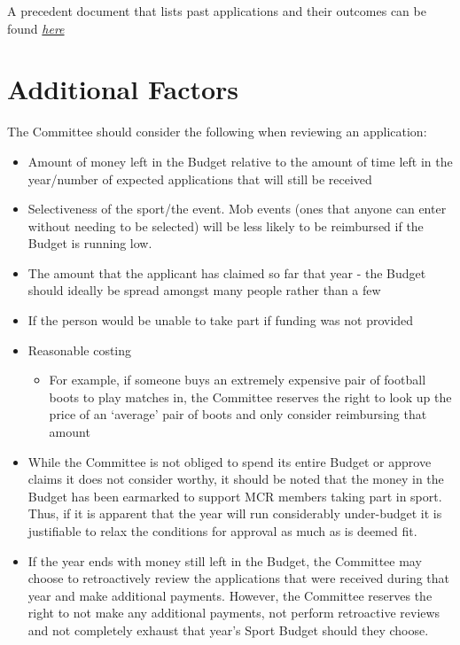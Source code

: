A precedent document that lists past applications and their outcomes can be found \href{https://docs.google.com/document/d/1C7BfB_jgS3wMEleUC6G4ZU182yfILvuTf4rHGR9wSyk/edit}{\textit{here}}

\section{Additional Factors}
The Committee should consider the following when reviewing an application:
\begin{itemize}
	\item Amount of money left in the Budget relative to the amount of time left in the year/number of expected applications that will still be received
	\item Selectiveness of the sport/the event. Mob events (ones that anyone can enter without needing to be selected) will be less likely to be reimbursed if the Budget is running low.
	\item The amount that the applicant has claimed so far that year - the Budget should ideally be spread amongst many people rather than a few
	\item If the person would be unable to take part if funding was not provided
	\item Reasonable costing
	\begin{itemize}
		\item For example, if someone buys an extremely expensive pair of football boots to play matches in, the Committee reserves the right to look up the price of an `average' pair of boots and only consider reimbursing that amount
	\end{itemize}
	\item While the Committee is not obliged to spend its entire Budget or approve claims it does not consider worthy, it should be noted that the money in the Budget has been earmarked to support MCR members taking part in sport. Thus, if it is apparent that the year will run considerably under-budget it is justifiable to relax the conditions for approval as much as is deemed fit.
	\item If the year ends with money still left in the Budget, the Committee may choose to retroactively review the applications that were received during that year and make additional payments. However, the Committee reserves the right to not make any additional payments, not perform retroactive reviews and not completely exhaust that year's Sport Budget should they choose.
\end{itemize}

